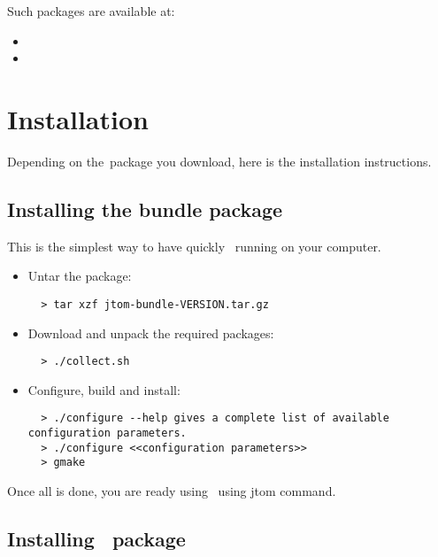 
Such packages are available at:
\begin{itemize}
\item {}
\item {}
\end{itemize}    

\section{Installation}
Depending on the\TOM\ package you download, here is the installation
instructions.

\subsection{Installing the bundle package}
This is the simplest way to have quickly \TOM\ running on your
computer.
\begin{itemize}
\item Untar the package:
\begin{verbatim}
  > tar xzf jtom-bundle-VERSION.tar.gz
\end{verbatim}
\item Download and unpack the required packages:
\begin{verbatim}
  > ./collect.sh
\end{verbatim}
\item Configure, build and install:
\begin{verbatim}
  > ./configure --help gives a complete list of available configuration parameters.
  > ./configure <<configuration parameters>>
  > gmake
\end{verbatim}
\end{itemize}

Once all is done, you are ready using \TOM\ using jtom command.

\subsection{Installing \TOM\ package}


